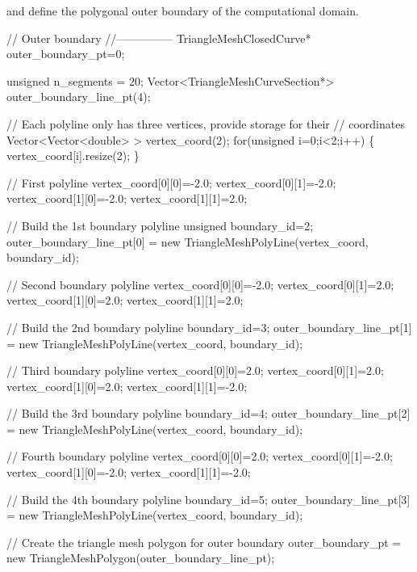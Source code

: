 and define the polygonal outer boundary of the computational domain.


\begin{DoxyCodeInclude}

 \textcolor{comment}{// Outer boundary}
 \textcolor{comment}{//---------------}
 TriangleMeshClosedCurve* outer\_boundary\_pt=0;

 \textcolor{keywordtype}{unsigned} n\_segments = 20;
 Vector<TriangleMeshCurveSection*> outer\_boundary\_line\_pt(4);

 \textcolor{comment}{// Each polyline only has three vertices, provide storage for their}
 \textcolor{comment}{// coordinates}
 Vector<Vector<double> > vertex\_coord(2);
 \textcolor{keywordflow}{for}(\textcolor{keywordtype}{unsigned} i=0;i<2;i++)
  \{
   vertex\_coord[i].resize(2);
  \}

 \textcolor{comment}{// First polyline}
 vertex\_coord[0][0]=-2.0;
 vertex\_coord[0][1]=-2.0;
 vertex\_coord[1][0]=-2.0;
 vertex\_coord[1][1]=2.0;

 \textcolor{comment}{// Build the 1st boundary polyline}
 \textcolor{keywordtype}{unsigned} boundary\_id=2;
 outer\_boundary\_line\_pt[0] = \textcolor{keyword}{new} TriangleMeshPolyLine(vertex\_coord,
                                                      boundary\_id);

 \textcolor{comment}{// Second boundary polyline}
 vertex\_coord[0][0]=-2.0;
 vertex\_coord[0][1]=2.0;
 vertex\_coord[1][0]=2.0;
 vertex\_coord[1][1]=2.0;

 \textcolor{comment}{// Build the 2nd boundary polyline}
 boundary\_id=3;
 outer\_boundary\_line\_pt[1] = \textcolor{keyword}{new} TriangleMeshPolyLine(vertex\_coord,
                                                      boundary\_id);

 \textcolor{comment}{// Third boundary polyline}
 vertex\_coord[0][0]=2.0;
 vertex\_coord[0][1]=2.0;
 vertex\_coord[1][0]=2.0;
 vertex\_coord[1][1]=-2.0;

 \textcolor{comment}{// Build the 3rd boundary polyline}
 boundary\_id=4;
 outer\_boundary\_line\_pt[2] = \textcolor{keyword}{new} TriangleMeshPolyLine(vertex\_coord,
                                                      boundary\_id);

 \textcolor{comment}{// Fourth boundary polyline}
 vertex\_coord[0][0]=2.0;
 vertex\_coord[0][1]=-2.0;
 vertex\_coord[1][0]=-2.0;
 vertex\_coord[1][1]=-2.0;

 \textcolor{comment}{// Build the 4th boundary polyline}
 boundary\_id=5;
 outer\_boundary\_line\_pt[3] = \textcolor{keyword}{new} TriangleMeshPolyLine(vertex\_coord,
                                                      boundary\_id);

 \textcolor{comment}{// Create the triangle mesh polygon for outer boundary}
 outer\_boundary\_pt = \textcolor{keyword}{new} TriangleMeshPolygon(outer\_boundary\_line\_pt);

\end{DoxyCodeInclude}


